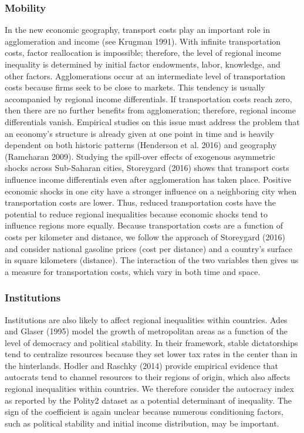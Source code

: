 \documentclass[10pt]{article}
\begin{document}
\subsubsection{Mobility}
In the new economic geography, transport costs play an important role in agglomeration and income (see Krugman 1991). With infinite transportation costs, factor reallocation is impossible; therefore, the level of regional income inequality is determined by initial factor endowments, labor, knowledge, and other factors. Agglomerations occur at an intermediate level of transportation costs because firms seek to be close to markets. This tendency is usually accompanied by regional income differentials. If transportation costs reach zero, then there are no further benefits from agglomeration; therefore, regional income differentials vanish. Empirical studies on this issue must address the problem that an economy's structure is already given at one point in time and is heavily dependent on both historic patterns (Henderson et al. 2016) and geography (Ramcharan 2009). Studying the spill-over effects of exogenous asymmetric shocks across Sub-Saharan cities, Storeygard (2016) shows that transport costs influence income differentials even after agglomeration has taken place. Positive economic shocks in one city have a stronger influence on a neighboring city when transportation costs are lower. Thus, reduced transportation costs have the potential to reduce regional inequalities because economic shocks tend to influence regions more equally. Because transportation costs are a function of costs per kilometer and distance, we follow the approach of Storeygard (2016) and consider national gasoline prices (cost per distance) and a country's surface in square kilometers (distance). The interaction of the two variables then gives us a measure for transportation costs, which vary in both time and space.

\subsubsection{Institutions}
Institutions are also likely to affect regional inequalities within countries. Ades and Glaser (1995) model the growth of metropolitan areas as a function of the level of democracy and political stability. In their framework, stable dictatorships tend to centralize resources because they set lower tax rates in the center than in the hinterlands. Hodler and Raschky (2014) provide empirical evidence that autocrats tend to channel resources to their regions of origin, which also affects regional inequalities within countries. We therefore consider the autocracy index as reported by the Polity2 dataset as a potential determinant of inequality. The sign of the coefficient is again unclear because numerous conditioning factors, such as political stability and initial income distribution, may be important.
\end{document}

